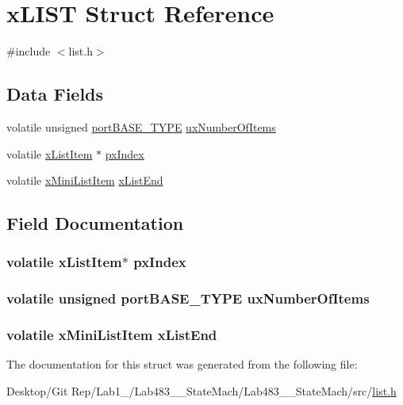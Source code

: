\hypertarget{structx_l_i_s_t}{\section{x\-L\-I\-S\-T Struct Reference}
\label{structx_l_i_s_t}
}


{\ttfamily \#include $<$list.\-h$>$}

\subsection*{Data Fields}
\begin{DoxyCompactItemize}
\item 
volatile unsigned \hyperlink{portmacro_8h_a1ebe82d24d764ae4e352f7c3a9f92c01}{port\-B\-A\-S\-E\-\_\-\-T\-Y\-P\-E} \hyperlink{structx_l_i_s_t_ac1b18253496c816fef57049f1352fabe}{ux\-Number\-Of\-Items}
\item 
volatile \hyperlink{list_8h_abc3e65a10b5c5f39142e64e69311797f}{x\-List\-Item} $\ast$ \hyperlink{structx_l_i_s_t_a90dec9c352d343df99d81237f2de2d35}{px\-Index}
\item 
volatile \hyperlink{list_8h_a9fb3b8c76f89efd6b8787f66e94ba04c}{x\-Mini\-List\-Item} \hyperlink{structx_l_i_s_t_ae19f18b24e6248ed6e735b69696156c7}{x\-List\-End}
\end{DoxyCompactItemize}


\subsection{Field Documentation}
\hypertarget{structx_l_i_s_t_a90dec9c352d343df99d81237f2de2d35}{
\subsubsection[{px\-Index}]{\setlength{\rightskip}{0pt plus 5cm}volatile {\bf x\-List\-Item}$\ast$ px\-Index}}\label{structx_l_i_s_t_a90dec9c352d343df99d81237f2de2d35}
\hypertarget{structx_l_i_s_t_ac1b18253496c816fef57049f1352fabe}{
\subsubsection[{ux\-Number\-Of\-Items}]{\setlength{\rightskip}{0pt plus 5cm}volatile unsigned {\bf port\-B\-A\-S\-E\-\_\-\-T\-Y\-P\-E} ux\-Number\-Of\-Items}}\label{structx_l_i_s_t_ac1b18253496c816fef57049f1352fabe}
\hypertarget{structx_l_i_s_t_ae19f18b24e6248ed6e735b69696156c7}{
\subsubsection[{x\-List\-End}]{\setlength{\rightskip}{0pt plus 5cm}volatile {\bf x\-Mini\-List\-Item} x\-List\-End}}\label{structx_l_i_s_t_ae19f18b24e6248ed6e735b69696156c7}


The documentation for this struct was generated from the following file\-:\begin{DoxyCompactItemize}
\item 
Desktop/\-Git Rep/\-Lab1\-\_/\-Lab483\-\_\-\_\-\-State\-Mach/\-Lab483\-\_\-\_\-\-State\-Mach/src/\hyperlink{list_8h}{list.\-h}\end{DoxyCompactItemize}
